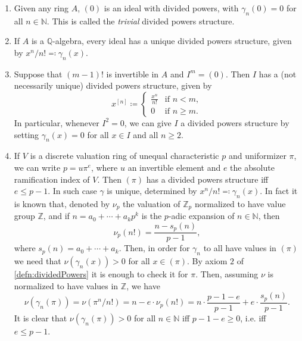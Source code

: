 \begin{ex}\leavevmode\vspace{-.2\baselineskip}
\begin{enumerate}\label{PDexamples}
	\item Given any ring $A$, $(0)$ is an ideal with divided powers,
		with $\gamma_n(0) = 0$ for all $n \in \mathbb{N}$.
		This is called the {\em trivial} divided powers structure.

	\item If $A$ is a $\mathbb{Q}$-algebra, every ideal has a unique
		divided powers structure, given by $x^n/n! \eqqcolon \gamma_n(x)$.

	\item Suppose that $\left( m-1 \right)!$ is invertible in $A$ and 
		$I^m = (0)$.
		Then $I$ has a (not necessarily unique) divided powers structure, given by
		\begin{equation*}
			x^{[n]} \coloneqq
			\begin{cases}
				\frac{ x^n }{ n! } & \text{if } n < m,\\
				0 & \text{if } n \geq m.
			\end{cases} 
		\end{equation*}
		In particular, whenever $I^2 = 0$, we can give $I$ a
		divided powers structure by setting $\gamma_n(x) = 0$
		for all $x \in I$ and all $n \geq 2$.

	\item\label{PDex:DVR} If $V$ is a discrete valuation ring of unequal characteristic $p$
		and uniformizer $\pi$, we can write $p = u \pi^e$,
		where $u$ an invertible element and $e$ the absolute ramification
		index of $V$.
		Then $\left( \pi \right)$ has a divided powers structure iff $e \leq p-1$.
		In such case $\gamma$ is unique, determined by
		$x^n/n! \eqqcolon \gamma_n(x)$.
		In fact it is known that, denoted by $\nu_p$ the valuation
		of $\mathbb{Z}_{p}$ normalized to have value group $\mathbb{Z}$,
		and if $n = a_0 + \cdots + a_kp^k$ is the $p$-adic expansion
		of $n \in \mathbb{N}$, then
		\begin{equation*}
			\nu_p(n!) = 
			\frac{n - s_p(n)}{p-1}
		,\end{equation*}
		where $s_p(n) = a_0 + \cdots + a_k$.
		Then, in order for $\gamma_n$ to all have values in $(\pi)$
		we need that $\nu(\gamma_n(x)) > 0$ for all $x \in (\pi)$.
		By axiom $2$ of \cref{defn:dividedPowers}
		it is enough to check it for $\pi$.
		Then, assuming $\nu$ is normalized to have values in $\mathbb{Z}$,
		we have
		\begin{equation*}
			\nu(\gamma_n(\pi)) = \nu(\pi^n/n!) =
			n - e \cdot \nu_p(n!) =
			n \cdot \frac{p - 1 - e}{p - 1} + e \cdot \frac{s_p(n)}{p - 1}
		.\end{equation*}
		It is clear that $\nu(\gamma_n(\pi)) > 0$ for all $n \in \mathbb{N}$
		iff $p - 1 - e \geq 0$, i.e. iff $e \leq p - 1$.
\end{enumerate}
\end{ex} 



